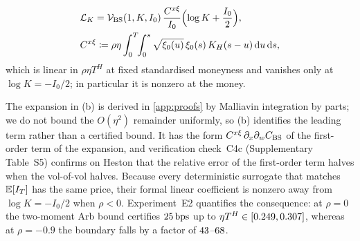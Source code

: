 \begin{theorem}
\begin{enumerate}[(a)]
  \begin{equation}
      \begin{aligned}
      &\mathcal{L}_K = \mathcal{V}_{\mathrm{BS}}(1,K,I_0)\,\frac{C^{x\xi}}{I_0}\Bigl(\log K + \frac{I_0}{2}\Bigr),\\
      &C^{x\xi} \coloneqq \rho\eta\int_0^T\!\!\int_0^s \sqrt{\xi_0(u)}\,\xi_0(s)\,K_H(s-u)\,\mathrm{d} u\,\mathrm{d} s,
      \end{aligned}
    \label{eq:homotopy_leverage}
  \end{equation}
  which is linear in $\rho\eta T^H$ at fixed standardised moneyness and vanishes only at $\log K=-I_0/2$; in particular it is nonzero at the money.
\end{enumerate}
\end{theorem}

The expansion in (b) is derived in \ref{app:proofs} by Malliavin integration by parts; we do not bound the $O(\eta^2)$ remainder uniformly, so (b) identifies the leading term rather than a certified bound. It has the form $C^{x\xi}\,\partial_x\partial_w C_{\mathrm{BS}}$ of the first-order term of the \citet{BergomiGuyon2012} expansion, and verification check~C4c (Supplementary Table~S5) confirms on Heston that the relative error of the first-order term halves when the vol-of-vol halves. Because every deterministic surrogate that matches $\mathbb{E}[I_T]$ has the same price, their formal linear coefficient is nonzero away from $\log K=-I_0/2$ when $\rho<0$. Experiment~E2 quantifies the consequence: at $\rho=0$ the two-moment Arb bound certifies $25\,\mathrm{bps}$ up to $\eta T^H\in[0.249,0.307]$, whereas at $\rho=-0.9$ the boundary falls by a factor of $43$--$68$.
